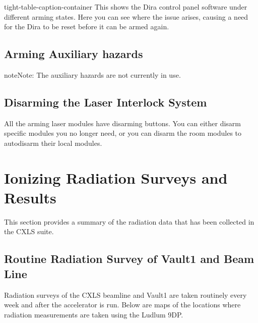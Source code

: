 \documentclass[letterpaper,10pt,english]{sphinxmanual}
\begin{document}
\begin{sphinxuseclass}{tight-table-caption-container}
\sphinxAtStartPar
{} This shows the Dira control panel software under different arming states. Here you can see where the issue arises, causing a need for the Dira to be reset before it can be armed again.

\end{sphinxuseclass}

\subsection{Arming Auxiliary hazards}
\label{\detokenize{user_documentation/Laser-1:arming-auxiliary-hazards}}
\begin{sphinxadmonition}{note}{Note:}
\sphinxAtStartPar
The auxiliary hazards are not currently in use.
\end{sphinxadmonition}


\subsection{Disarming the Laser Interlock System}
\label{\detokenize{user_documentation/Laser-1:disarming-the-laser-interlock-system}}
\sphinxAtStartPar
All the arming laser modules have disarming buttons.
You can either disarm specific modules you no longer need, or you can disarm the room modules to auto\sphinxhyphen{}disarm their local modules.

\sphinxstepscope


\section{Ionizing Radiation Surveys and Results}
\label{\detokenize{user_documentation/radiation_data:ionizing-radiation-surveys-and-results}}\label{\detokenize{user_documentation/radiation_data::doc}}
\sphinxAtStartPar
This section provides a summary of the radiation data that has been collected in the CXLS suite.


\subsection{Routine Radiation Survey of Vault\sphinxhyphen{}1 and Beam Line}
\label{\detokenize{user_documentation/radiation_data:routine-radiation-survey-of-vault-1-and-beam-line}}
\sphinxAtStartPar
Radiation surveys of the CXLS beamline and Vault\sphinxhyphen{}1 are taken routinely every week and after the accelerator is run.
Below are maps of the locations where radiation measurements are taken using the Ludlum 9DP.
\end{document}
